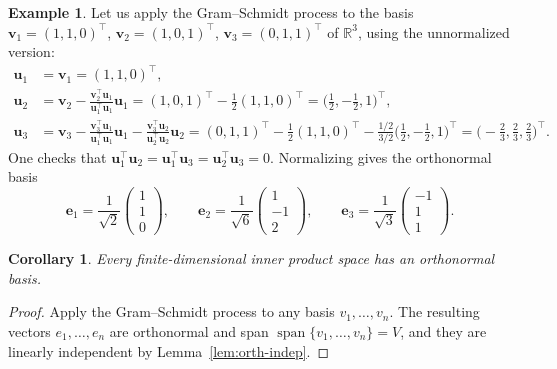 \documentclass[11pt]{article}
\theoremstyle{definition}
\newtheorem{example}[definition]{Example}
\theoremstyle{plain}
\newtheorem{corollary}[definition]{Corollary}
\theoremstyle{remark}
\DeclareMathOperator{\Span}{span}
\begin{document}
\begin{example}\label{ex:gram-schmidt}
    Let us apply the Gram--Schmidt process to the basis $\mathbf{v}_1 = (1, 1, 0)^\top$, $\mathbf{v}_2 = (1, 0, 1)^\top$, $\mathbf{v}_3 = (0, 1, 1)^\top$ of $\mathbb{R}^3$, using the unnormalized version:
    \begin{align*}
        \mathbf{u}_1 &= \mathbf{v}_1 = (1, 1, 0)^\top, \\
        \mathbf{u}_2 &= \mathbf{v}_2 - \frac{\mathbf{v}_2^\top \mathbf{u}_1}{\mathbf{u}_1^\top \mathbf{u}_1} \mathbf{u}_1 = (1, 0, 1)^\top - \frac{1}{2}(1, 1, 0)^\top = \big(\tfrac{1}{2}, -\tfrac{1}{2}, 1\big)^\top, \\
        \mathbf{u}_3 &= \mathbf{v}_3 - \frac{\mathbf{v}_3^\top \mathbf{u}_1}{\mathbf{u}_1^\top \mathbf{u}_1} \mathbf{u}_1 - \frac{\mathbf{v}_3^\top \mathbf{u}_2}{\mathbf{u}_2^\top \mathbf{u}_2} \mathbf{u}_2 = (0, 1, 1)^\top - \frac{1}{2}(1, 1, 0)^\top - \frac{1/2}{3/2}\big(\tfrac{1}{2}, -\tfrac{1}{2}, 1\big)^\top = \big(-\tfrac{2}{3}, \tfrac{2}{3}, \tfrac{2}{3}\big)^\top.
    \end{align*}
    One checks that $\mathbf{u}_1^\top \mathbf{u}_2 = \mathbf{u}_1^\top \mathbf{u}_3 = \mathbf{u}_2^\top \mathbf{u}_3 = 0$. Normalizing gives the orthonormal basis
    \[\mathbf{e}_1 = \frac{1}{\sqrt{2}} \begin{pmatrix} 1 \\ 1 \\ 0 \end{pmatrix}, \qquad \mathbf{e}_2 = \frac{1}{\sqrt{6}} \begin{pmatrix} 1 \\ -1 \\ 2 \end{pmatrix}, \qquad \mathbf{e}_3 = \frac{1}{\sqrt{3}} \begin{pmatrix} -1 \\ 1 \\ 1 \end{pmatrix}.\]
\end{example}

\begin{corollary}\label{cor:onb-exists}
    Every finite-dimensional inner product space has an orthonormal basis.
\end{corollary}

\begin{proof}
    Apply the Gram--Schmidt process to any basis $v_1, \ldots, v_n$. The resulting vectors $e_1, \ldots, e_n$ are orthonormal and span $\Span\{v_1, \ldots, v_n\} = V$, and they are linearly independent by Lemma~\ref{lem:orth-indep}.
\end{proof}
\end{document}
